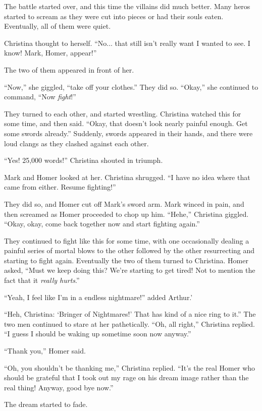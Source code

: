 \documentclass[showtrims,b6paper,draft,10pt]{memoir}
\begin{document}
The battle started over, and this time the villains did much better.  Many heros started to scream as they were cut into pieces or had their souls eaten.  Eventually, all of them were quiet.

Christina thought to herself.  ``No... that still isn't really want I wanted to see.  I know!  Mark, Homer, appear!''

The two of them appeared in front of her.

``Now,'' she giggled, ``take off your clothes.''  They did so.  ``Okay,'' she continued to command, ``Now \emph{fight}!''

They turned to each other, and started wrestling.  Christina watched this for some time, and then said.  ``Okay, that doesn't look nearly painful enough.  Get some swords already.''  Suddenly, swords appeared in their hands, and there were loud clangs as they clashed against each other.

``Yes!  25,000 words!'' Christina shouted in triumph.

Mark and Homer looked at her.  Christina shrugged.  ``I have no idea where that came from either.  Resume fighting!''

They did so, and Homer cut off Mark's sword arm.  Mark winced in pain, and then screamed as Homer proceeded to chop up him.  ``Hehe,''  Christina giggled.  ``Okay, okay, come back together now and start fighting again.''

They continued to fight like this for some time, with one occasionally dealing a painful series of mortal blows to the other followed by the other resurrecting and starting to fight again.  Eventually the two of them turned to Christina.  Homer asked,  ``Must we keep doing this?  We're starting to get tired!  Not to mention the fact that it \emph{really hurts}.''

``Yeah, I feel like I'm in a endless nightmare!'' added Arthur.'

``Heh, Christina:  `Bringer of Nightmares!'  That has kind of a nice ring to it.''  The two men continued to stare at her pathetically.  ``Oh, all right,'' Christina replied.  ``I guess I should be waking up sometime soon now anyway.''

``Thank you,'' Homer said.

``Oh, you shouldn't be thanking me,'' Christina replied.  ``It's the real Homer who should be grateful that I took out my rage on his dream image rather than the real thing!  Anyway, good bye now.''

The dream started to fade.
\end{document}
